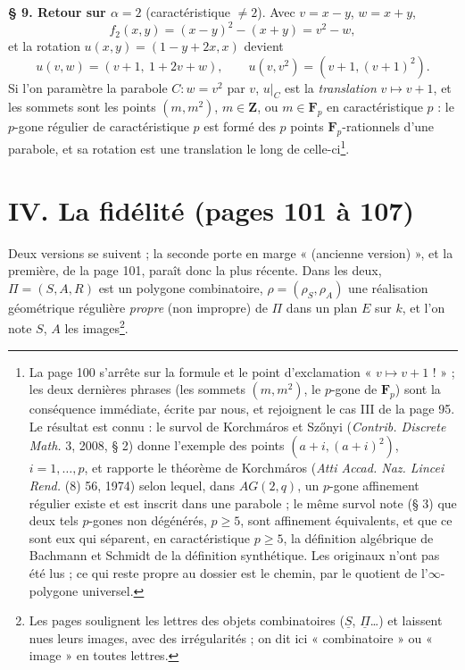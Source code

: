 \documentclass[11pt,a4paper]{article}
\begin{document}
\textbf{§ 9. Retour sur $\alpha = 2$} (caractéristique $\neq 2$). Avec $v = x
- y$, $w = x + y$,
\[
  f_2(x, y) = (x - y)^2 - (x + y) = v^2 - w ,
\]
et la rotation $u(x, y) = (1 - y + 2x, x)$ devient
\[
  u(v, w) = (v + 1,\ 1 + 2v + w), \qquad u(v, v^2) = (v + 1, (v + 1)^2) .
\]
Si l'on paramètre la parabole $C : w = v^2$ par $v$, $u|_C$ est la
\emph{translation} $v \mapsto v + 1$, et les sommets sont les points $(m,
m^2)$, $m \in \mathbf{Z}$, ou $m \in \mathbf{F}_p$ en caractéristique $p$ :
le $p$-gone régulier de caractéristique $p$ est formé des $p$ points
$\mathbf{F}_p$-rationnels d'une parabole, et sa rotation est une translation
le long de celle-ci\footnote{La page 100 s'arrête sur la formule et le point
d'exclamation « $v \mapsto v + 1$ ! » ; les deux dernières phrases (les
sommets $(m, m^2)$, le $p$-gone de $\mathbf{F}_p$) sont la conséquence immédiate,
écrite par nous, et rejoignent le cas III de la page 95. Le résultat est
connu : le survol de Korchmáros et Szőnyi (\emph{Contrib. Discrete Math.} 3,
2008, § 2) donne l'exemple des points $(a + i, (a + i)^{2})$,
$i = 1, \ldots, p$, et rapporte le théorème de Korchmáros (\emph{Atti Accad.
Naz. Lincei Rend.} (8) 56, 1974) selon lequel, dans $AG(2, q)$, un $p$-gone
affinement régulier existe et est inscrit dans une parabole ; le même survol
note (§ 3) que deux tels $p$-gones non dégénérés, $p \geq 5$, sont
affinement équivalents, et que ce sont eux qui séparent, en caractéristique
$p \geq 5$, la définition algébrique de Bachmann et Schmidt de la définition
synthétique. Les originaux n'ont pas été lus ; ce qui reste propre au dossier
est le chemin, par le quotient de l'$\infty$-polygone universel.}.

\section*{IV. La fidélité (pages 101 à 107)}

Deux versions se suivent ; la seconde porte en marge « (ancienne version) »,
et la première, de la page 101, paraît donc la plus récente. Dans les deux,
$\Pi = (S, A, R)$ est un polygone combinatoire, $\rho = (\rho_S, \rho_A)$ une
réalisation géométrique régulière \emph{propre} (non impropre) de $\Pi$ dans un
plan $E$ sur $k$, et l'on note $S$, $A$ les images\footnote{Les pages
soulignent les lettres des objets combinatoires ($\underline{S}$,
$\underline{\Pi}$\ldots) et laissent nues leurs images, avec des
irrégularités ; on dit ici « combinatoire » ou « image » en toutes lettres.}.
\end{document}
